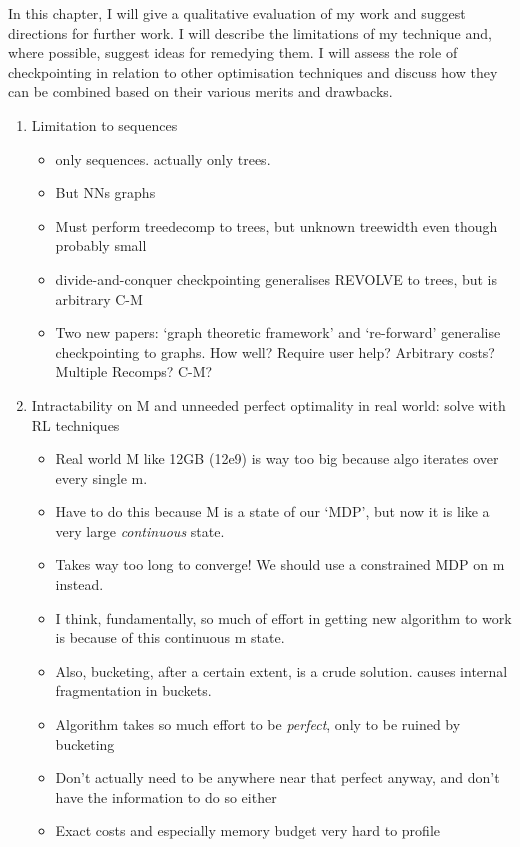 In this chapter, I will give a qualitative evaluation of my work and suggest directions for further work.
I will describe the limitations of my technique and, where possible, suggest ideas for remedying them.
I will assess the role of checkpointing in relation to other optimisation techniques and discuss how they can be combined based on their various merits and drawbacks.

\begin{enumerate}
    \item Limitation to sequences
    \begin{itemize}
        \item only sequences. actually only trees.
        \item But NNs graphs
        \item Must perform treedecomp to trees, but unknown treewidth even though probably small
        \item divide-and-conquer checkpointing generalises REVOLVE to trees, but is arbitrary C-M
        \item Two new papers: `graph theoretic framework' and `re-forward' generalise checkpointing to graphs. How well? Require user help? Arbitrary costs? Multiple Recomps? C-M?
    \end{itemize}
    \item Intractability on M and unneeded perfect optimality in real world: solve with RL techniques
    \begin{itemize}
        \item Real world M like 12GB (12e9) is way too big because algo iterates over every single m.
        \item Have to do this because M is a state of our `MDP', but now it is like a very large \textit{continuous} state.
        \item Takes way too long to converge! We should use a constrained MDP on m instead.
        \item I think, fundamentally, so much of effort in getting new algorithm to work is because of this continuous m state.
        \item Also, bucketing, after a certain extent, is a crude solution. causes internal fragmentation in buckets.
        \item Algorithm takes so much effort to be \textit{perfect}, only to be ruined by bucketing
        \item Don't actually need to be anywhere near that perfect anyway, and don't have the information to do so either
        \item Exact costs and especially memory budget very hard to profile

\end{itemize}
\end{enumerate}
